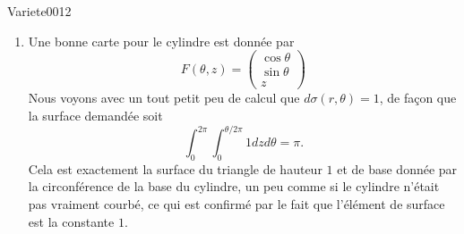 \begin{corrige}{Variete0012}
\begin{enumerate}
		\item
			Une bonne carte pour le cylindre est donnée par
			\begin{equation}
				F(\theta,z)=\begin{pmatrix}
					\cos\theta	\\ 
					\sin\theta	\\ 
					z	
				\end{pmatrix}
			\end{equation}
			Nous voyons avec un tout petit peu de calcul que $d\sigma(r,\theta)=1$, de façon que la surface demandée soit
			\begin{equation}
				\int_0^{2\pi}\int_0^{\theta/2\pi}1 dzd\theta=\pi.
			\end{equation}
			Cela est exactement la surface du triangle de hauteur $1$ et de base donnée par la circonférence de la base du cylindre, un peu comme si le cylindre n'était pas vraiment courbé, ce qui est confirmé par le fait que l'élément de surface est la constante $1$.

	\end{enumerate}
	
\end{corrige}
